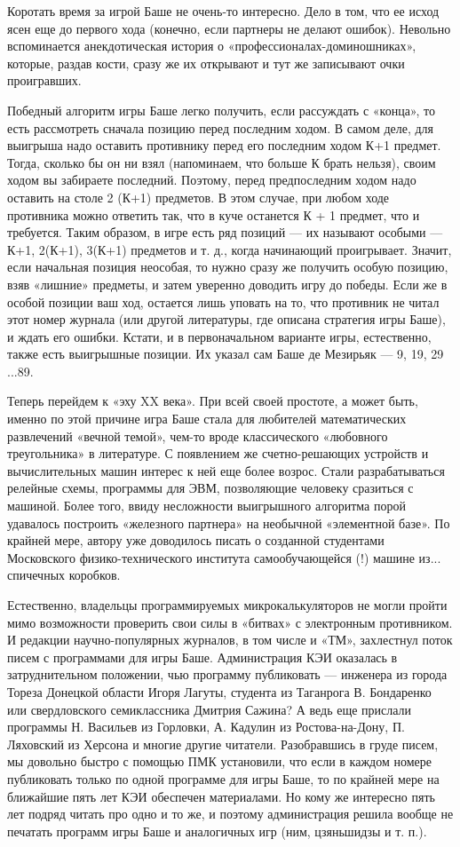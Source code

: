 \documentclass[11pt,a4paper,oneside]{article}
\begin{document}
Коротать время за игрой Баше не очень-то интересно. Дело в том, что ее исход ясен еще до первого хода (конечно, если партнеры не делают ошибок). Невольно вспоминается анекдотическая история о «профессионалах-доминошниках», которые, раздав кости, сразу же их открывают и тут же записывают очки проигравших.

Победный алгоритм игры Баше легко получить, если рассуждать с «конца», то есть рассмотреть сначала позицию перед последним ходом. В самом деле, для выигрыша надо оставить противнику перед его последним ходом К+1 предмет. Тогда, сколько бы он ни взял (напоминаем, что больше К брать нельзя), своим ходом вы забираете последний. Поэтому, перед предпоследним ходом надо оставить на столе 2 (К+1) предметов. В этом случае, при любом ходе противника можно ответить так, что в куче останется К + 1 предмет, что и требуется. Таким образом, в игре есть ряд позиций — их называют особыми — К+1, 2(К+1), 3(К+1) предметов и т. д., когда начинающий проигрывает. Значит, если начальная позиция неособая, то нужно сразу же получить особую позицию, взяв «лишние» предметы, и затем уверенно доводить игру до победы. Если же в особой позиции ваш ход, остается лишь уповать на то, что противник не читал этот номер журнала (или другой литературы, где описана стратегия игры Баше), и ждать его ошибки. Кстати, и в первоначальном варианте игры, естественно, также есть выигрышные позиции. Их указал сам Баше де Мезирьяк — 9, 19, 29 ...89.

Теперь перейдем к «эху XX века». При всей своей простоте, а может быть, именно по этой причине игра Баше стала для любителей математических развлечений «вечной темой», чем-то вроде классического «любовного треугольника» в литературе. С появлением же счетно-решающих устройств и вычислительных машин интерес к ней еще более возрос. Стали разрабатываться релейные схемы, программы для ЭВМ, позволяющие человеку сразиться с машиной. Более того, ввиду несложности выигрышного алгоритма порой удавалось построить «железного партнера» на необычной «элементной базе». По крайней мере, автору уже доводилось писать о созданной студентами Московского физико-технического института самообучающейся (!) машине из... спичечных коробков.

Естественно, владельцы программируемых микрокалькуляторов не могли пройти мимо возможности проверить свои силы в «битвах» с электронным противником. И редакции научно-популярных журналов, в том числе и «ТМ», захлестнул поток писем с программами для игры Баше. Администрация КЭИ оказалась в затруднительном положении, чью программу публиковать — инженера из города Тореза Донецкой области Игоря Лагуты, студента из Таганрога В. Бондаренко или свердловского семиклассника Дмитрия Сажина? А ведь еще прислали программы Н. Васильев из Горловки, А. Кадулин из Ростова-на-Дону, П. Ляховский из Херсона и многие другие читатели. Разобравшись в груде писем, мы довольно быстро с помощью ПМК установили, что если в каждом номере публиковать только по одной программе для игры Баше, то по крайней мере на ближайшие пять лет КЭИ обеспечен материалами. Но кому же интересно пять лет подряд читать про одно и то же, и поэтому администрация решила вообще не печатать программ игры Баше и аналогичных игр (ним, цзяньшидзы и т. п.).
\end{document}
